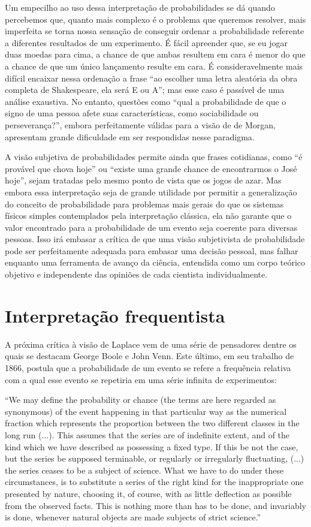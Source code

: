 Um empecilho ao uso dessa interpretação de probabilidades se dá quando percebemos que, quanto mais complexo é o 
problema que queremos resolver, mais imperfeita se torna nossa sensação de conseguir ordenar a probabilidade referente
a diferentes resultados de um experimento. É fácil apreender que, se eu jogar duas moedas para cima, a chance de que ambas 
resultem em cara é menor do que a chance de que um único lançamento resulte em cara. É consideravelmente mais difícil encaixar
nessa ordenação a frase ``ao escolher uma letra aleatória da obra completa de Shakespeare, ela será E ou A''; mas esse caso
é passível de uma análise exaustiva. No entanto, questões como ``qual a probabilidade de que o signo de uma pessoa afete
suas características, como sociabilidade ou perseverança?'', embora perfeitamente válidas para a visão de de Morgan, apresentam
grande dificuldade em ser respondidas nesse paradigma.

A visão subjetiva de probabilidades permite ainda que frases cotidianas, como ``é provável que chova hoje'' ou ``existe uma grande
chance de encontrarmos o José hoje'', sejam tratadas pelo mesmo ponto de vista que os jogos de azar. Mas
embora essa interpretação seja de grande utilidade por permitir a generalização do conceito de probabilidade para problemas
mais gerais do que os sistemas físicos simples contemplados pela interpretação clássica, ela não garante que o valor encontrado
para a probabilidade de um evento seja coerente para diversas pessoas. Isso irá embasar a crítica de que uma visão subjetivista 
de probabilidade pode ser perfeitamente adequada para embasar uma decisão pessoal, mas falhar enquanto uma ferramenta de 
avanço da ciência, entendida como um corpo teórico objetivo e independente das opiniões de cada cientista individualmente.

\section{Interpretação frequentista}
A próxima crítica à visão de Laplace vem de uma série de pensadores dentre os quais se destacam George Boole e John Venn.
Este último, em seu trabalho de 
1866, postula que a probabilidade de um evento se refere a frequência relativa com a qual esse evento se repetiria em uma
série infinita de experimentos:

``We may define the probability or chance (the terms are here regarded as synonymous) of the event happening in that
particular way as the numerical fraction which represents the proportion between the two different classes in the long run (...).
This assumes that the series are of indefinite extent, and of the kind which we have described as possessing a fixed type.
If this be not the case, but the series be supposed terminable, or regularly or irregularly fluctuating, (...) the series ceases
to be a subject of science. What we have to do under these circumstances, is to substitute a series of the right kind for
the inappropriate one presented by nature, choosing it, of course, with as little deflection as possible from the observed facts.
This is nothing more than has to be done, and invariably is done, whenever natural objects are made subjects of strict science.''
\citep{Venn1866}

